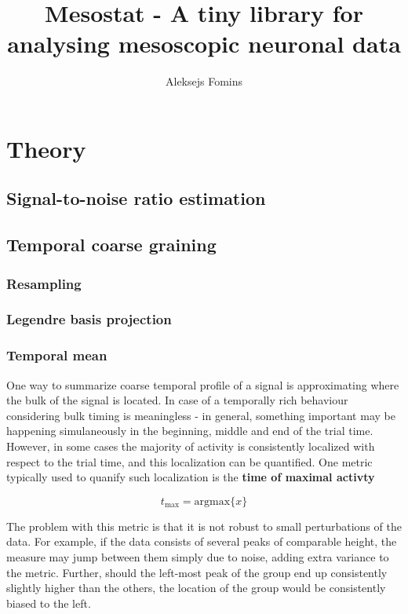 \documentclass[a4paper,10pt]{article}
\title{Mesostat - A tiny library for analysing mesoscopic neuronal data}
\author{Aleksejs Fomins}
\begin{document}
\maketitle

\section{Theory}

\subsection{Signal-to-noise ratio estimation}

\newpage
\subsection{Temporal coarse graining}

\subsubsection{Resampling}

\subsubsection{Legendre basis projection}

\subsubsection{Temporal mean}

One way to summarize coarse temporal profile of a signal is approximating where 
the bulk of the signal is located. In case of a temporally rich behaviour 
considering bulk timing is meaningless - in general, something important may be 
happening simulaneously in the beginning, middle and end of the trial time. 
However, in some cases the majority of activity is consistently localized with 
respect to the trial time, and this localization can be quantified. One metric 
typically used to quanify such localization is the \textbf{time of maximal 
activty}

\begin{equation}
    t_{\max} = \mathrm{argmax}\{x\}
\end{equation}

The problem with this metric is that it is not robust to small perturbations of 
the data. For example, if the data consists of several peaks of comparable 
height, the measure may jump between them simply due to noise, adding extra 
variance to the metric. Further, should the left-most peak of the group end up 
consistently slightly higher than the others, the location of the group would 
be consistently biased to the left. \\
\end{document}
